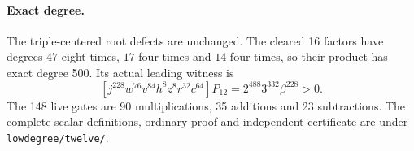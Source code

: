 \paragraph{Exact degree.}
The triple-centered root defects are unchanged.  The cleared 16 factors
have degrees $47$ eight times, $17$ four times and $14$ four times,
so their product has exact degree 500.  Its actual leading witness is
\[
 [j^{228}w^{76}v^{84}h^8z^8r^{32}c^{64}]P_{12}
   =2^{488}3^{332}\beta^{228}>0.
\]
The 148 live gates are 90 multiplications, 35 additions and 23 subtractions.
The complete scalar definitions, ordinary proof and independent certificate
are under \texttt{lowdegree/twelve/}.
